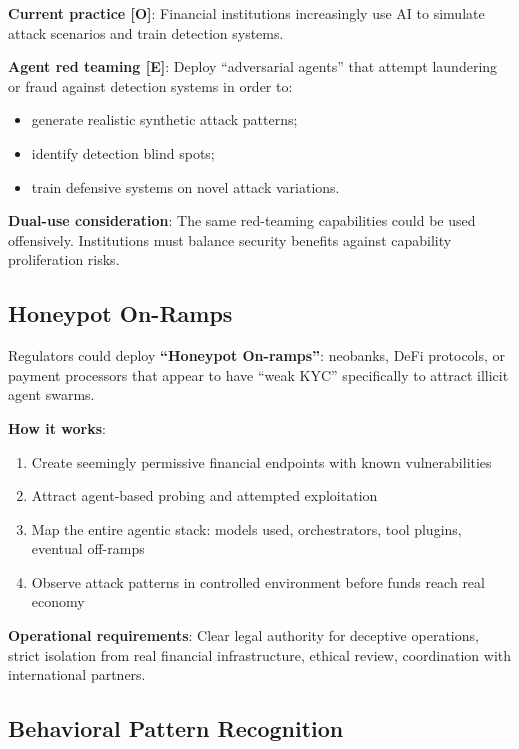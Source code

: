 \documentclass[11pt,letterpaper]{article}
\begin{document}
\textbf{Current practice [O]}: Financial institutions increasingly use AI to simulate attack scenarios and train detection systems.

\textbf{Agent red teaming [E]}: Deploy ``adversarial agents'' that attempt laundering or fraud against detection systems in order to:
\begin{itemize}
  \item generate realistic synthetic attack patterns;
  \item identify detection blind spots;
  \item train defensive systems on novel attack variations.
\end{itemize}

\textbf{Dual-use consideration}: The same red-teaming capabilities could be used offensively. Institutions must balance security benefits against capability proliferation risks.

\subsection{Honeypot On-Ramps}

\begin{recbox}
Regulators could deploy \textbf{``Honeypot On-ramps''}: neobanks, DeFi protocols, or payment processors that appear to have ``weak KYC'' specifically to attract illicit agent swarms.

\textbf{How it works}:
\begin{enumerate}
  \item Create seemingly permissive financial endpoints with known vulnerabilities
  \item Attract agent-based probing and attempted exploitation
  \item Map the entire agentic stack: models used, orchestrators, tool plugins, eventual off-ramps
  \item Observe attack patterns in controlled environment before funds reach real economy
\end{enumerate}

\textbf{Operational requirements}: Clear legal authority for deceptive operations, strict isolation from real financial infrastructure, ethical review, coordination with international partners.
\end{recbox}

\subsection{Behavioral Pattern Recognition}
\end{document}
